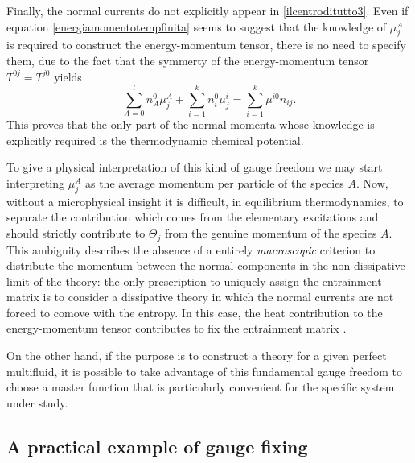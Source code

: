 \documentclass[usenatbib]{mnras}
\begin{document}
Finally, the normal currents do not explicitly appear in \eqref{ilcentroditutto3}. Even if equation \eqref{energiamomentotempfinita} seems to suggest that the knowledge of $\mu^A_j$ is required to construct the energy-momentum tensor, there is no need to specify them, due to the fact that the symmerty of the energy-momentum tensor $T^{0j}=T^{j0}$ yields
%
\begin{equation}
\sum_{A=0}^l n_A^0 \mu^A_j + \sum_{i=1}^k n_i^0 \mu^i_j = \sum_{i=1}^k \mu^{i0} n_{ij}.
\end{equation}
%
This proves that the only part of the normal momenta whose knowledge is explicitly required is the thermodynamic chemical potential. 

To give a physical interpretation of this kind of gauge freedom we may start interpreting $\mu_j^A$ as the average momentum per particle of the species $A$. Now, without a microphysical insight it is difficult, in equilibrium thermodynamics, to separate the contribution which comes from the elementary excitations and should strictly contribute to $\Theta_j$ from the genuine momentum of the species $A$. 
%
%
This ambiguity describes the absence of a entirely \emph{macroscopic} criterion to distribute the momentum between the normal components in the non-dissipative limit of the theory: the only prescription to uniquely assign the entrainment matrix is to consider a dissipative theory in which the normal currents are not forced to comove with the entropy. In this case, the heat contribution to the energy-momentum tensor contributes to fix the entrainment matrix \citep[see e.g.][]{lopez2011}. 

On the other hand, if the purpose is to construct a theory for a given perfect multifluid, it is possible to take advantage of this fundamental gauge freedom to choose a master function that is particularly convenient for the specific system under study. 


\subsection{A practical example of gauge fixing}
\label{A concrete example}
\end{document}
